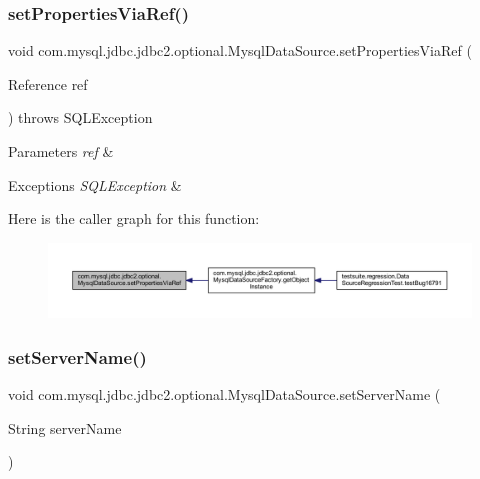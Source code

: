 \subsubsection{\texorpdfstring{set\+Properties\+Via\+Ref()}{setPropertiesViaRef()}}
{\footnotesize\ttfamily void com.\+mysql.\+jdbc.\+jdbc2.\+optional.\+Mysql\+Data\+Source.\+set\+Properties\+Via\+Ref (\begin{DoxyParamCaption}\item[{Reference}]{ref }\end{DoxyParamCaption}) throws S\+Q\+L\+Exception}


\begin{DoxyParams}{Parameters}
{\em ref} & \\
\hline
\end{DoxyParams}

\begin{DoxyExceptions}{Exceptions}
{\em S\+Q\+L\+Exception} & \\
\hline
\end{DoxyExceptions}
Here is the caller graph for this function\+:
\nopagebreak
\begin{figure}[H]
\begin{center}
\leavevmode
\includegraphics[width=350pt]{classcom_1_1mysql_1_1jdbc_1_1jdbc2_1_1optional_1_1_mysql_data_source_a49e5afebf285cf08c2f2fae76d63aba4_icgraph}
\end{center}
\end{figure}
\mbox{\label{classcom_1_1mysql_1_1jdbc_1_1jdbc2_1_1optional_1_1_mysql_data_source_aa9b7531972e6bf6b0c4488bf41307581}} 
\subsubsection{\texorpdfstring{set\+Server\+Name()}{setServerName()}}
{\footnotesize\ttfamily void com.\+mysql.\+jdbc.\+jdbc2.\+optional.\+Mysql\+Data\+Source.\+set\+Server\+Name (\begin{DoxyParamCaption}\item[{String}]{server\+Name }\end{DoxyParamCaption})}

